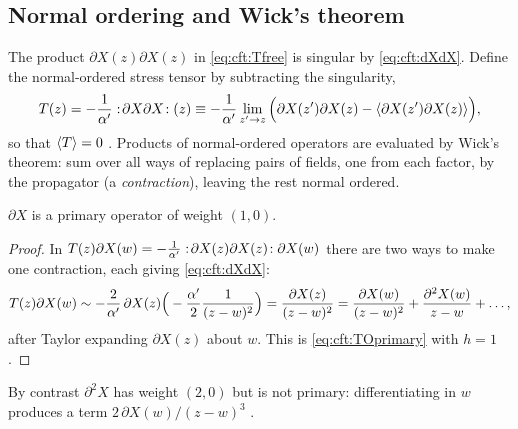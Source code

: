 \subsection{Normal ordering and Wick's theorem}

The product $\partial X(z)\partial X(z)$ in \eqref{eq:cft:Tfree} is singular by
\eqref{eq:cft:dXdX}. Define the normal-ordered stress tensor by subtracting
the singularity,
\begin{equation}\label{eq:cft:Tnormal}
  T(z)=-\frac1{\alpha'}:\!\partial X\partial X\!:(z)\equiv-\frac1{\alpha'}\lim_{z'\to z}
  \Big(\partial X(z')\partial X(z)-\langle \partial X(z')\partial X(z)\rangle\Big),
\end{equation}
so that $\langle T\rangle=0$ . Products of normal-ordered operators
are evaluated by Wick's theorem: sum over all ways of replacing pairs of fields, one from each
factor, by the propagator (a \emph{contraction}), leaving the rest normal ordered.

\begin{proposition}[\TL]\label{prop:cft:dXprimary}
$\partial X$ is a primary operator of weight $(1,0)$.
\end{proposition}
\begin{proof}
In $T(z)\partial X(w)=-\frac1{\alpha'}:\!\partial X(z)\partial X(z)\!:\partial X(w)$ there are two
ways to make one contraction, each giving \eqref{eq:cft:dXdX}:
\begin{equation*}
  T(z)\partial X(w)\sim-\frac{2}{\alpha'}\,\partial X(z)\Big(-\frac{\alpha'}2\frac1{(z-w)^2}\Big)
  =\frac{\partial X(z)}{(z-w)^2}
  =\frac{\partial X(w)}{(z-w)^2}+\frac{\partial^2X(w)}{z-w}+\dots ,
\end{equation*}
after Taylor expanding $\partial X(z)$ about $w$. This is \eqref{eq:cft:TOprimary} with $h=1$
.
\end{proof}

By contrast $\partial^2X$ has weight $(2,0)$ but is not primary: differentiating in $w$ produces
a term $2\,\partial X(w)/(z-w)^3$ .

